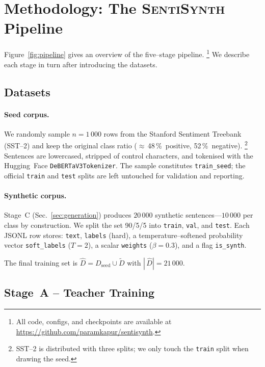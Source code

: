\documentclass[11pt]{article}
\begin{document}
\section{Methodology: The \textsc{SentiSynth} Pipeline}
\label{sec:method}

Figure~\ref{fig:pipeline} gives an overview of the five--stage
pipeline.%
\footnote{All code, configs, and checkpoints are available at
\url{https://github.com/paramkapur/sentisynth}.}
We describe each stage in turn after introducing the datasets.

\subsection{Datasets}
\label{sec:data}

\paragraph{Seed corpus.}
We randomly sample $n\!=\!1\,000$ rows from the Stanford Sentiment
Treebank (SST--2) and keep the original class ratio
($\approx$\,48\,\%~positive, 52\,\%~negative).%
\footnote{SST--2 is distributed with three splits; we only touch the
\texttt{train} split when drawing the seed.}
Sentences are lowercased, stripped of control characters, and
tokenised with the Hugging~Face \texttt{DeBERTaV3Tokenizer}.
The sample constitutes \texttt{train\_seed}; the official
\texttt{train} and \texttt{test} splits are left untouched for
validation and reporting.

\paragraph{Synthetic corpus.}
Stage~C (Sec.~\ref{sec:generation}) produces $20\,000$ synthetic
sentences---$10\,000$ per class by construction.  We split the set
90/5/5 into \texttt{train}, \texttt{val}, and \texttt{test}.
Each JSONL row stores:
\texttt{text}, \texttt{labels} (hard), a temperature--softened
probability vector \texttt{soft\_labels} ($T\!=\!2$), a scalar
\texttt{weights} ($\beta\!=\!0.3$), and a flag \texttt{is\_synth}.

The final training set is
$\hat{D}=D_{\text{seed}}\!\cup\!\tilde{D}$ with $|\,\hat{D}|=21\,000$.

\subsection{Stage~A -- Teacher Training}
\label{sec:teacher}
\end{document}
